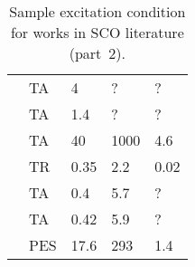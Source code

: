 \begin{table}[htp!]
{\begin{tabular}{ C{1cm}  C{2cm} C{2.65cm} C{2.75cm} C{1cm} }
      \cite{Bertoni2016b}   & TA     & 4      & ?      & ?     \\
      \cite{Marino2015}     & TA     & 1.4    & ?      & ?     \\
      \cite{Marino2016}     & TA     & 40     & 1000   & 4.6   \\
      \cite{Parpiiev2017}   & TR     & 0.35   & 2.2    & 0.02  \\
      \cite{Zerdane2017}    & TA     & 0.4    & 5.7    & ?     \\
      \cite{Zerdane2017}    & TA     & 0.42   & 5.9    & ?     \\
      \cite{Moguilevski2016} & PES   & 17.6   & 293    & 1.4   \\
      \bottomrule
    \end{tabular}
  }
  \caption{Sample excitation condition for works in SCO literature (part~2).}
  \label{tab: SCO-exc-app-2}
\end{table}


